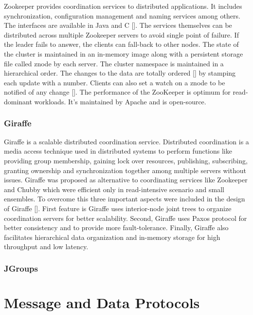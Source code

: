 Zookeeper provides coordination services to distributed applications.
It includes synchronization, configuration management and naming
services among others. The interfaces are available in Java and
C [\cite{www-zoo-overiew}]. The services themselves can be distributed
across multiple Zookeeper servers to avoid single point of failure.
If the leader fails to answer, the clients can fall-back to other
nodes. The state of the cluster is maintained in an in-memory image
along with a persistent storage file called znode by each server. The
cluster namespace is maintained in a hierarchical order. The changes
to the data are totally ordered [\cite{www-zoo-wiki}] by stamping each
update with a number. Clients can also set a watch on a znode to be
notified of any change [\cite{www-zoo-ibm}]. The performance of the
ZooKeeper is optimum for read-dominant workloads. It's maintained by
Apache and is open-source.

\subsubsection{Giraffe}

Giraffe is a scalable distributed coordination service. Distributed
coordination is a media access technique used in distributed systems
to perform functions like providing group membership, gaining lock
over resources, publishing, subscribing, granting ownership and
synchronization together among multiple servers without
issues. Giraffe was proposed as alternative to coordinating services
like Zookeeper and Chubby which were efficient only in read-intensive
scenario and small ensembles. To overcome this three important aspects
were included in the design of Giraffe [\cite{giraffePaper}]. First
feature is Giraffe uses interior-node joint trees to organize
coordination servers for better scalability. Second, Giraffe uses
Paxos protocol for better consistency and to provide more
fault-tolerance. Finally, Giraffe also facilitates hierarchical data
organization and in-memory storage for high throughput and low
latency.
     
\subsubsection{JGroups}

\section{Message and Data Protocols}

